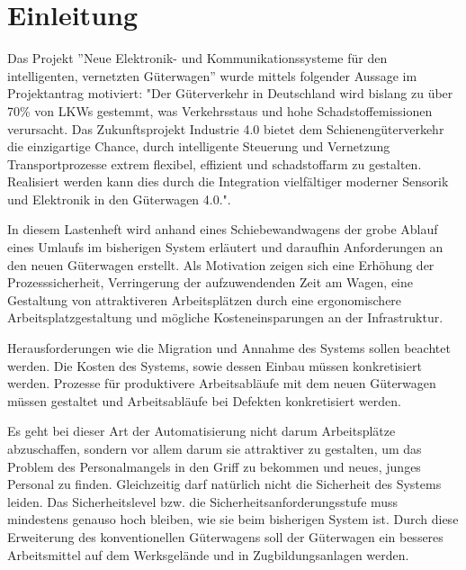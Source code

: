 \section{Einleitung}
Das Projekt ”Neue Elektronik- und Kommunikationssysteme für den intelligenten, vernetzten Güterwagen'' wurde mittels folgender Aussage im Projektantrag motiviert: "Der Güterverkehr in Deutschland wird bislang zu über 70\% von LKWs gestemmt, was Verkehrsstaus und hohe Schadstoffemissionen verursacht. Das Zukunftsprojekt Industrie 4.0 bietet dem Schienengüterverkehr die einzigartige Chance, durch intelligente Steuerung und Vernetzung Transportprozesse extrem flexibel, effizient und schadstoffarm zu gestalten. Realisiert werden kann dies durch die Integration vielfältiger moderner Sensorik und Elektronik in den Güterwagen 4.0.". \cite{AZAP} \par
In diesem Lastenheft wird anhand eines Schiebewandwagens der grobe Ablauf eines Umlaufs im bisherigen System erläutert und daraufhin Anforderungen an den neuen Güterwagen erstellt. Als Motivation zeigen sich eine Erhöhung der Prozesssicherheit, Verringerung der aufzuwendenden Zeit am Wagen, eine Gestaltung von attraktiveren Arbeitsplätzen durch eine ergonomischere Arbeitsplatzgestaltung und mögliche Kosteneinsparungen an der Infrastruktur.\par
Herausforderungen wie die Migration und Annahme des Systems sollen beachtet werden. Die Kosten des Systems, sowie dessen Einbau müssen konkretisiert werden. Prozesse für produktivere Arbeitsabläufe mit dem neuen Güterwagen müssen gestaltet und Arbeitsabläufe bei Defekten konkretisiert werden.\par
Es geht bei dieser Art der Automatisierung nicht darum Arbeitsplätze abzuschaffen, sondern vor allem darum sie attraktiver zu gestalten, um das Problem des Personalmangels in den Griff zu bekommen und neues, junges Personal zu finden. Gleichzeitig darf natürlich nicht die Sicherheit des Systems leiden. Das Sicherheitslevel bzw. die Sicherheitsanforderungsstufe muss mindestens genauso hoch bleiben, wie sie beim bisherigen System ist. Durch diese Erweiterung des konventionellen Güterwagens soll der Güterwagen ein besseres Arbeitsmittel auf dem Werksgelände und in Zugbildungsanlagen werden.\par

